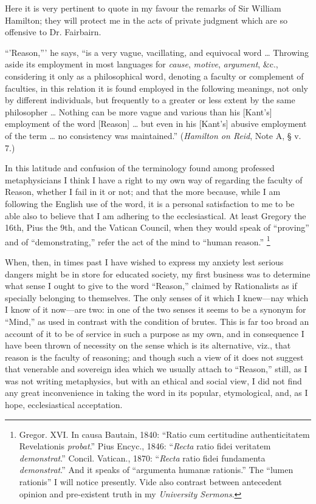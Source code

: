 Here it is very pertinent to quote in my favour
the remarks of Sir William Hamilton; they will protect me in the acts
of private judgment which are so offensive to Dr. Fairbairn.

``'Reason,''' he says, ``is a very vague,
vacillating, and equivocal word … Throwing aside its employment
in most languages for \emph{cause}, \emph{motive}, \emph{argument},
\&c., considering it only as a philosophical word, denoting a
faculty or complement of faculties, in this relation it is found
employed in the following meanings, not only by different individuals,
but frequently to a greater or less extent by the same philosopher …
Nothing can be more vague and various than his [Kant's] employment of
the word [Reason] … but even in his [Kant's] abusive employment of
the term … no consistency was maintained.'' (\emph{Hamilton on Reid},
Note A, § v. 7.)

In this latitude and confusion of the terminology
found among professed metaphysicians I think I have a right to my own
way of regarding the faculty of Reason, whether I fail in it or not;
and that the more because, while I am following the English use of the
word, it is a personal satisfaction to me to be able also to believe
that I am adhering to the ecclesiastical. At least Gregory the 16th,
Pius the 9th, and the Vatican Council, when they would speak of ``proving''
and of ``demonstrating,'' refer the act of the mind to ``human reason.'' \footnote{Gregor. XVI. In
causa Bautain, 1840: ``Ratio cum certitudine authenticitatem
Revelationis \emph{probat}.'' Pius Encyc., 1846: ``\emph{Recta} ratio
fidei veritatem \emph{demonstrat}.'' Concil. Vatican., 1870: ``\emph{Recta}
ratio fidei fundamenta \emph{demonstrat}.'' And it speaks of ``argumenta
humanæ rationis.'' The ``lumen rationis'' I will notice presently. Vide
also contrast between antecedent opinion and pre-existent truth in my \emph{University
Sermons}.}


When, then, in times past I have wished to
express my anxiety lest serious dangers might be in store for educated
society, my first business was to determine what sense I ought to give
to the word ``Reason,'' claimed by Rationalists as if specially
belonging to themselves. The only senses of it which I knew—nay
which I know of it now—are two: in one of the two senses it seems to
be a synonym for ``Mind,'' as used in contrast with the condition of
brutes. This is far too broad an account of it to be of service in
such a purpose as my own, and in consequence I have been thrown of
necessity on the sense which is its alternative, viz., that reason is
the faculty of reasoning; and though such a view of it does not
suggest that venerable and sovereign idea which we usually attach to ``Reason,''
still, as I was not writing metaphysics, but with an ethical and
social view, I did not find any great inconvenience in taking the word
in its popular, etymological, and, as I hope, ecclesiastical
acceptation.

